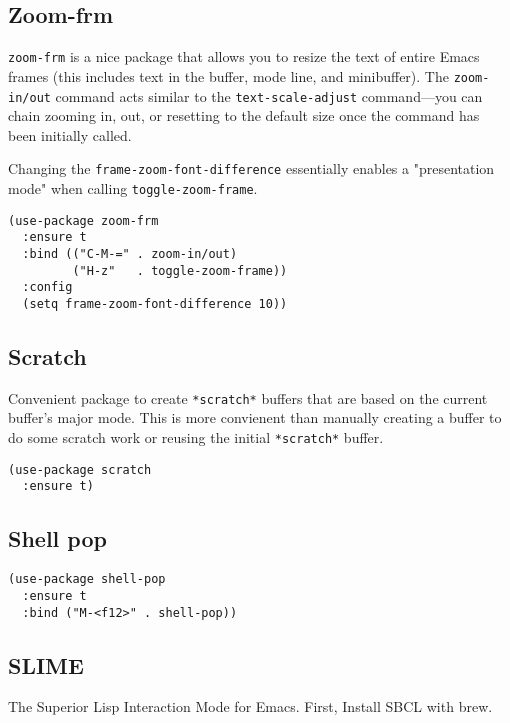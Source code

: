 \documentclass[11pt]{article}
\begin{document}
\subsection{Zoom-frm}
\label{sec-18-39}

\texttt{zoom-frm} is a nice package that allows you to resize the text of
entire Emacs frames (this includes text in the buffer, mode line, and
minibuffer). The \texttt{zoom-in/out} command acts similar to the
\texttt{text-scale-adjust} command---you can chain zooming in, out, or
resetting to the default size once the command has been initially
called.

Changing the \texttt{frame-zoom-font-difference} essentially enables a
"presentation mode" when calling \texttt{toggle-zoom-frame}.

\begin{verbatim}
(use-package zoom-frm
  :ensure t
  :bind (("C-M-=" . zoom-in/out)
         ("H-z"   . toggle-zoom-frame))
  :config
  (setq frame-zoom-font-difference 10))
\end{verbatim}

\subsection{Scratch}
\label{sec-18-40}

Convenient package to create \texttt{*scratch*} buffers that are based on the
current buffer's major mode. This is more convienent than manually
creating a buffer to do some scratch work or reusing the initial
\texttt{*scratch*} buffer.

\begin{verbatim}
(use-package scratch
  :ensure t)
\end{verbatim}

\subsection{Shell pop}
\label{sec-18-41}

\begin{verbatim}
(use-package shell-pop
  :ensure t
  :bind ("M-<f12>" . shell-pop))
\end{verbatim}

\subsection{SLIME}
\label{sec-18-42}

The Superior Lisp Interaction Mode for Emacs. First, Install SBCL with
brew.
\end{document}
